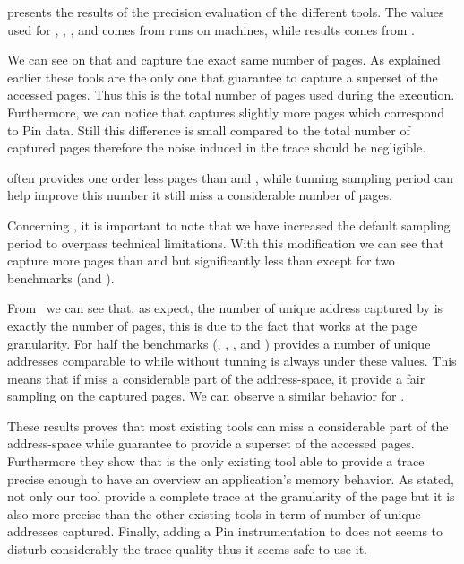  presents the results of the precision evaluation of the
different tools. The values used for \Mitos, \MitosTun, \Moca, \MocaPin and
\TABARNAC comes from runs on \Edel machines, while \MemProf results comes from
\Idfreeze.

We can see on  that \Moca and \TABARNAC capture the exact same
number of pages. As explained earlier these tools are the only one that
guarantee to capture a superset of the accessed pages. Thus this is the total
number of pages used during the execution. Furthermore, we can notice that
\MocaPin captures slightly more pages which correspond to Pin data. Still
this difference is small compared to the total number of captured pages
therefore the noise induced in the trace should be negligible.

\Mitos often provides one order less pages than \Moca and \TABARNAC, while
tunning \Mitos sampling period can help improve this number it still miss a
considerable number of pages.

Concerning \MemProf, it is important to note that we have increased the
default sampling period to overpass technical limitations. With this
modification we can see that \MemProf capture more pages than \Mitos
and \MitosTun but significantly less than
\Moca except for two benchmarks (\SP and \LU).

From  we can see that, as expect, the number of unique address captured by
\TABARNAC is exactly the number of pages, this is due to the fact that
\TABARNAC works at the page granularity. For half the benchmarks (\BT,
\EP, \LU, \SP and \UA) \MitosTun provides a number of unique addresses
comparable to \Moca while \Mitos without tunning is always under these values.
This means that if \Mitos miss a considerable part of the address-space, it
provide a fair sampling on the captured pages. We can observe a similar
behavior for \MemProf.

These results proves that most existing tools can miss a considerable part of
the address-space while \Moca guarantee to provide a superset of the accessed
pages. Furthermore they show that \Moca is the only existing tool able to provide a
trace precise enough to have an overview an application's memory behavior. As
stated, not only our tool provide a complete trace at the granularity of the
page but it is also more precise than the other existing tools in term of
number of unique addresses captured. Finally, adding a Pin instrumentation to
\Moca does not seems to disturb considerably the trace quality thus it seems
safe to use it.


